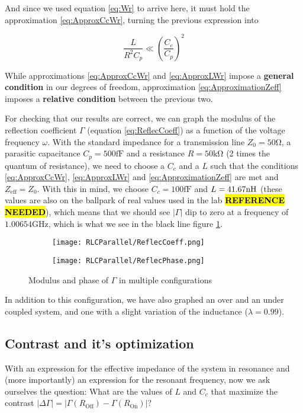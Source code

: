 \documentclass[../main.tex]{subfiles}
\begin{document}
And since we used equation \ref{eq:Wr} to arrive here, it must hold
the approximation \ref{eq:ApproxCcWr}, turning the previous expression into

\begin{equation}
\label{eq:ApproximationZeff}
    \frac{L}{R^2 C_{p}} \ll \left(\frac{C_{c}}{C_{p}}\right)^2
\end{equation}

While approximations \ref{eq:ApproxCcWr} and \ref{eq:ApproxLWr} impose a
\textbf{general condition} in our degrees of freedom, approximation
\ref{eq:ApproximationZeff} imposes a \textbf{relative condition} between
the previous two.

For checking that our results are correct, we can graph the modulus of the
reflection coefficient \(\Gamma\) (equation \ref{eq:ReflecCoeff}) as a function
of the voltage frequency \(\omega\). With the standard impedance for a
transmission line \(Z_{0} = 50 \unit{\ohm}\), a parasitic capacitance
\(C_{p} = 500 \unit{\fF}\) and a resistance \(R = 50\unit{\kohm}\)
(2 times the quantum of resistance), we need to choose a \(C_{c}\) and a \(L\)
such that the conditions \ref{eq:ApproxCcWr}, \ref{eq:ApproxLWr} and
\ref{eq:ApproximationZeff} are met and \(Z_{\text{eff}} = Z_{0}\). With this in
mind, we choose \(C_{c} = 100 \unit{\fF}\) and \(L = 41.67 \unit{\nH}\)
(these values are also on the ballpark of real values used in the lab 
\hl{\textbf{REFERENCE NEEDED}}), which means that we should see \(|\Gamma|\)
dip to zero at a frequency of \(1.00654 \unit{\giga\hertz}\), which is what we
see in the black line figure \ref{fig:ReflexCoeffAndPhase}.


\begin{figure}[htb]
\centering
\begin{subfigure}[T]{.5\textwidth}
  \centering
  \texttt{[image: RLCParallel/ReflecCoeff.png]}
\end{subfigure}%
\begin{subfigure}[T]{.5\textwidth}
  \centering
  \texttt{[image: RLCParallel/ReflecPhase.png]}
\end{subfigure}
\caption{Modulus and phase of \(\Gamma\) in multiple configurations}
\label{fig:ReflexCoeffAndPhase}
\end{figure}

In addition to this configuration, we have also graphed an over and an
under coupled system, and one with a slight variation of the inductance
(\(\lambda = 0.99\)).


\subsection{Contrast and it's optimization}
With an expression for the effective impedance of the system in resonance and
(more importantly) an expression for the resonant frequency, now we ask
ourselves the question: What are the values of \(L\) and \(C_{c}\) that
maximize the contrast
\(|\Delta\Gamma| = |\Gamma(R_{\text{Off}}) - \Gamma(R_{\text{On}})|\)?
\end{document}
